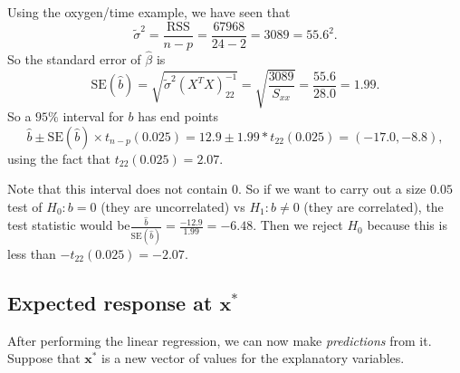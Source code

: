 \documentclass[a4paper]{article}
\begin{document}
\begin{eg}
  Using the oxygen/time example, we have seen that
  \[
    \tilde{\sigma}^2 = \frac{\mathrm{RSS}}{n - p} = \frac{67968}{24 - 2} = 3089 = 55.6^2.
  \]
  So the standard error of $\hat{\beta}$ is
  \[
    \mathrm{SE}(\hat{b}) = \sqrt{\tilde{\sigma}^2(X^TX)_{22}^{-1}} = \sqrt{\frac{3089}{S_{xx}}} = \frac{55.6}{28.0} = 1.99.
  \]
  So a $95\%$ interval for $b$ has end points
  \[
    \hat{b}\pm \mathrm{SE}(\hat{b})\times t_{n - p}(0.025) = 12.9\pm 1.99*t_{22}(0.025) = (-17.0, -8.8),
  \]
  using the fact that $t_{22}(0.025) = 2.07$.

  Note that this interval does not contain $0$. So if we want to carry out a size $0.05$ test of $H_0: b = 0$ (they are uncorrelated) vs $H_1: b \not= 0$ (they are correlated), the test statistic would be$\frac{\hat{b}}{\mathrm{SE}(\hat{b})} = \frac{-12.9}{1.99} = -6.48$. Then we reject $H_0$ because this is less than $-t_{22}(0.025) = -2.07$.
\end{eg}
\subsection{Expected response at \texorpdfstring{$\mathbf{x}^*$}{x*}}
After performing the linear regression, we can now make \emph{predictions} from it. Suppose that $\mathbf{x}^*$ is a new vector of values for the explanatory variables.
\end{document}
